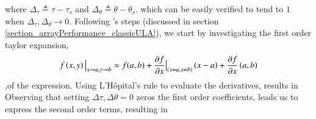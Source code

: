     \else
    \fi
    where $ \Delta_{\tau} \triangleq \tau-\tau_{s} $ and $ \Delta_{\theta} \triangleq \theta-\theta_{s}$.
    which can be easily verified to tend to $ 1 $ when $ \Delta_{\tau},\Delta_{\theta} \rightarrow 0$. 
    Following \cite{VanTrees2002DetectionIV}'s steps (discussed in section \ref{section_arrayPerformance_classicULA}), we start by investigating the first order taylor expansion,$$ \evalat{f\rBrace{x,y}}{x\to{}a,y\to{}b} \approx f(a,b) + \evalat{\frac{\partial{f}}{\partial{x}}}{\rBrace{x=a,x=b}}\rBrace{x-a} + \frac{\partial{f}}{\partial{x}}\rBrace{a,b} $$,of the expression.
    Using L'Hôpital's rule to evaluate the derivatives, results in 
    Observing that setting $\Delta{\tau},\Delta{\theta} = 0$ zeros the first order coefficients, leads us to express the second order terms, resulting in 
